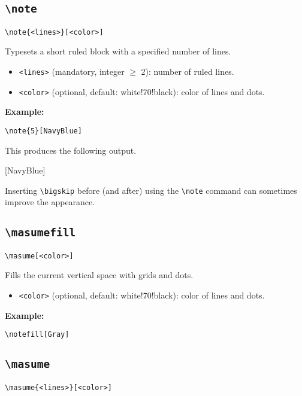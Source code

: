\documentclass[a4paper,12pt]{article}
\begin{document}
\subsection{\texttt{\textbackslash note}}
\begin{verbatim}
\note{<lines>}[<color>]
\end{verbatim}

Typesets a short ruled block with a specified number of lines.

\begin{itemize}
    \item \texttt{<lines>} (mandatory, integer $\ge$ 2): number of ruled lines.
    \item \texttt{<color>} (optional, default: white!70!black): color of lines and dots.
\end{itemize}

\textbf{Example:}
\begin{verbatim}
\note{5}[NavyBlue]
\end{verbatim}

This produces the following output.\bigskip

[NavyBlue]

\bigskip Inserting \verb|\bigskip| before (and after) using the \verb|\note| command can sometimes improve the appearance.

\subsection{\texttt{\textbackslash masumefill}}
\begin{verbatim}
\masume[<color>]
\end{verbatim}

Fills the current vertical space with grids and dots.

\begin{itemize}
  \item \texttt{<color>} (optional, default: white!70!black): color of lines and dots.
\end{itemize}

\textbf{Example:}
\begin{verbatim}
\notefill[Gray]
\end{verbatim}

\subsection{\texttt{\textbackslash masume}}
\begin{verbatim}
\masume{<lines>}[<color>]
\end{verbatim}
\end{document}
